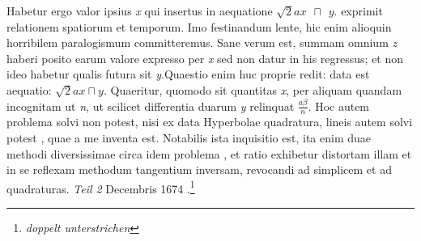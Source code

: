                          \pend
                         \pstart
                       Habetur ergo valor ipsius \textit{x} qui insertus in aequatione $\surd 2ax\hspace{5pt} \sqcap\hspace{5pt} y$. exprimit relationem spatiorum et temporum. Imo festinandum lente, hic enim alioquin horribilem paralogismum committeremus. Sane verum est, summam omnium \textit{z} haberi posito earum valore expresso per \textit{x} sed non datur in his regressus; et non ideo habetur qualis futura sit \textit{y}.\pend \pstart Quaestio enim huc proprie redit: data est aequatio: $\surd 2ax \sqcap y$. Quaeritur, quomodo  sit quantitas \textit{x}, per aliquam quandam incognitam ut \textit{n}, ut scilicet differentia duarum \textit{y} relinquat $\displaystyle \frac{a\beta}{n}$. Hoc autem problema  solvi non potest, nisi ex data Hyperbolae quadratura, lineis autem solvi potest , quae a me inventa est. Notabilis ista inquisitio est, ita enim duae methodi diversissimae circa idem problema , et ratio exhibetur distortam illam et in se reflexam methodum tangentium inversam, revocandi ad simplicem et ad quadraturas.
                       \pend
                        \clearpage
                          \pstart
    \centering        \lbrack\textit{Teil 2}\rbrack
            \pend
                       \pstart
                      [9 r\textsuperscript{o}] Decembris 1674 
                       \pend
                       \pstart
                       \centering
                       .\footnote{ \textit{doppelt unterstrichen}}\pend
